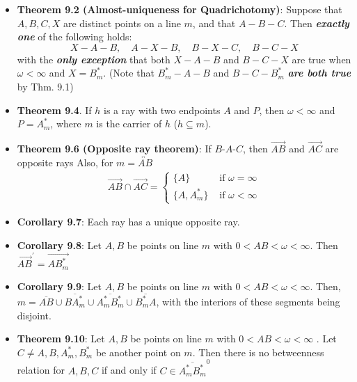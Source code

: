 \documentclass{report}
\begin{document}
\begin{itemize}
        \item \textbf{Theorem 9.2 (Almost-uniqueness for Quadrichotomy)}:  
            Suppose that \( A, B, C, X \) are distinct points on a line \( m \),  
            and that \( A - B - C \). Then \textbf{\textit{exactly one}} of the following holds:  
            \[
                X - A - B, \quad A - X - B, \quad B - X - C, \quad B - C - X
            \]
            with the \textbf{\textit{only exception}} that both \( X - A - B \) and \( B - C - X \) are true  
            when \( \omega < \infty \) and \( X = B_m^* \).
            \bigbreak \noindent 
            (Note that \( B_m^* - A - B \) and \( B - C - B_m^* \) \textbf{\textit{are both true}} by Thm. 9.1)
        \item \textbf{Theorem 9.4}.
            If \( h \) is a ray with two endpoints \( A \) and \( P \),  
            then \( \omega < \infty \) and \( P = A_m^* \), where \( m \) is the carrier of \( h \) (\( h \subseteq m \)).
        \item \textbf{Theorem 9.6 (Opposite ray theorem)}: If $ B\text{-}A\text{-}C$, then $\overrightarrow{AB}$ and $\overrightarrow{AC}$ are opposite rays
            \bigbreak \noindent 
            Also, for $m = \overleftrightarrow{AB}$
            \begin{align*}
                \overrightarrow{AB} \cap \overrightarrow{AC} = 
                \begin{cases}
                    \{A\}     & \text{ if } \omega = \infty \\
                    \{A, A_{m}^{*}\}     & \text{ if } \omega<\infty
                \end{cases}
            \end{align*}
        \item \textbf{Corollary 9.7}: Each ray has a unique opposite ray.
        \item \textbf{Corollary 9.8}: Let $A,B$ be points on line $m$ with $0 <AB<\omega <\infty$. Then $\overrightarrow{AB}^{\prime} = \overrightarrow{AB_{m}^{*}} $
        \item \textbf{Corollary 9.9}: Let $A,B$ be points on line $m$ with $ 0 < AB < \omega < \infty$. Then, $ m = \overline{AB} \cup \overline{BA_{m}^{*}} \cup \overline{A_{m}^{*}B_{m}^{*}} \cup \overline{B_{m}^{*}A}$, with the interiors of these segments being disjoint.
        \item \textbf{Theorem 9.10}: Let $A,B$ be points on line $m$ with $0 < AB < \omega < \infty$ . Let $C \ne A,B,A_{m}^{*}, B_{m}^{*} $ be another point on $m$. Then there is no betweenness relation for $A,B,C$ if and only if $C \in \overline{A_{m}^{*}B_{m}^{*}}^{0}$

\end{itemize}
\end{document}
